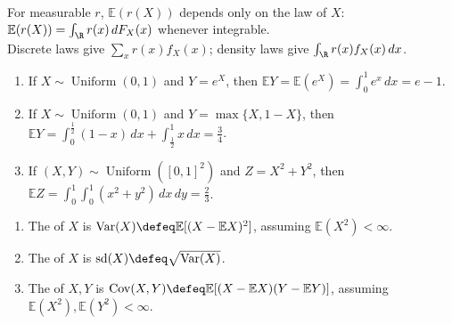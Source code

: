 \begin{remark} \label{rem:expectation-section-source-scope} \\
For measurable $r$, $\mathbb{E}(r(X))$ depends only on the law of $X$: $\mathbb{E}(r(X))=\int_{\R}r(x)\,dF_X(x)$ whenever integrable.\\
Discrete laws give $\sum\limits_x r(x)f_X(x)$; density laws give $\int_{\R}r(x)f_X(x)\,dx$.
\end{remark}

\begin{example} \label{ex:lotus-transform-examples} 
\begin{enumerate}[label=(\roman*)]
\setlength{\itemsep}{0pt}
\item If $X\sim\operatorname{Uniform}(0,1)$ and $Y=e^X$, then $\mathbb{E}Y=\mathbb{E}(e^X)=\int_0^1e^x\,dx=e-1$.
\item If $X\sim\operatorname{Uniform}(0,1)$ and $Y=\max\{X,1-X\}$, then $\mathbb{E}Y=\int_0^{\frac{1}{2}}(1-x)\,dx+\int_{\frac{1}{2}}^{1}x\,dx=\frac{3}{4}$.
\item If $(X,Y)\sim\operatorname{Uniform}([0,1]^2)$ and $Z=X^2+Y^2$, then $\mathbb{E}Z=\int_0^1\int_0^1(x^2+y^2)\,dx\,dy=\frac{2}{3}$.
\end{enumerate}
\end{example}

\begin{definition} \label{def:variance-covariance-and-standard-deviation} 
\begin{enumerate}[label=(\roman*)]
\setlength{\itemsep}{0pt}
\item The  of $X$ is $\operatorname{Var}(X)\defeq\mathbb{E}[(X-\mathbb{E}X)^2]$, assuming $\mathbb{E}(X^2)<\infty$.
\item The  of $X$ is $\operatorname{sd}(X)\defeq\sqrt{\operatorname{Var}(X)}$.
\item The  of $X,Y$ is $\operatorname{Cov}(X,Y)\defeq\mathbb{E}[(X-\mathbb{E}X)(Y-\mathbb{E}Y)]$, assuming $\mathbb{E}(X^2),\mathbb{E}(Y^2)<\infty$.
\end{enumerate}
\end{definition}
